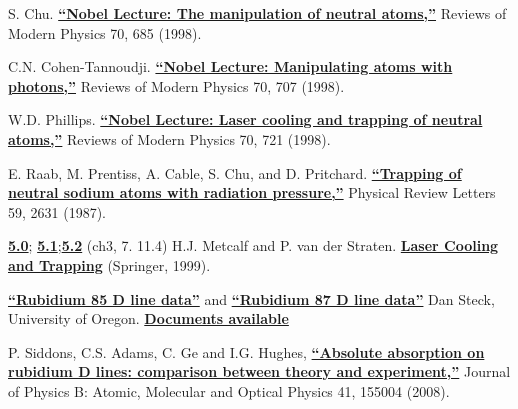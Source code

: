 \documentclass{../lab}
\begin{document}
\begin{thebibliography}{}
\label{sec:References}
     S. Chu. \href{http://physics111.lib.berkeley.edu/Physics111/Reprints/MOT/Steven\_Chu-Neutral\_Particles.pdf}{\textbf{``Nobel Lecture: The manipulation of neutral atoms,''}} Reviews of Modern Physics 70, 685 (1998).

     C.N. Cohen-Tannoudji. \href{http://physics111.lib.berkeley.edu/Physics111/Reprints/MOT/Cohen-Tannoudji\_RMP\_70-707.pdf}{\textbf{``Nobel Lecture: Manipulating atoms with photons,''}} Reviews of Modern Physics 70, 707 (1998).

     W.D. Phillips. \href{http://physics111.lib.berkeley.edu/Physics111/Reprints/MOT/W.Philips_RMP_70-3-1998_p721_1.pdf}{\textbf{``Nobel Lecture: Laser cooling and trapping of neutral atoms,''}} Reviews of Modern Physics 70, 721 (1998).

     E. Raab, M. Prentiss, A. Cable, S. Chu, and D. Pritchard. \href{http://physics111.lib.berkeley.edu/Physics111/Reprints/MOT/Raab_Prentiss_Chu_PRL_v59-23-1987.pdf}{\textbf{``Trapping of neutral sodium atoms with radiation pressure,''}} Physical Review Letters 59, 2631 (1987).

     \href{http://physics111.lib.berkeley.edu/Physics111/Reprints/MOT/Laser\_Cooling\_and\_Trapping\_HJ\_Metcalf/MOT\%20OCR\%20ch.\%203\%20force\%20on\%20two-level\%20atoms.pdf}{\textbf{5.0}}; \href{http://physics111.lib.berkeley.edu/Physics111/Reprints/MOT/Laser\_Cooling\_and\_Trapping\_HJ\_Metcalf/MOT\%20OCR\%20ch.\%207\%20optical\%20molasses.pdf}{\textbf{5.1}};\href{http://physics111.lib.berkeley.edu/Physics111/Reprints/MOT/Laser\_Cooling\_and\_Trapping\_HJ\_Metcalf/MOT\%20OCR\%20\%20ch.\%2011.4\%20magneto-optical\%20traps.pdf}{\textbf{5.2}} (ch3, 7. 11.4) H.J. Metcalf and P. van der Straten. \href{http://physics111.lib.berkeley.edu/Physics111/Reprints/MOT/Laser\_Cooling\_and\_Trapping\_HJ\_Metcalf/}{\textbf{Laser Cooling and Trapping}} (Springer, 1999).

     \href{http://physics111.lib.berkeley.edu/Physics111/Reprints/MOT/rubidium85numbers.pdf}{\textbf{``Rubidium 85 D line data''}} and \href{http://physics111.lib.berkeley.edu/Physics111/Reprints/MOT/rubidium87numbers.pdf}{\textbf{``Rubidium 87 D line data''}} Dan Steck, University of Oregon. \href{http://steck.us/alkalidata/}{\textbf{Documents available}}

     P. Siddons, C.S. Adams, C. Ge and I.G. Hughes, \href{http://physics111.lib.berkeley.edu/Physics111/Reprints/MOT/Absolute\%20absorption\%20on\%20the\%20rubidium\%20D\%20lines-0805.1139v1.pdf}{\textbf{``Absolute absorption on rubidium D lines: comparison between theory and experiment,''}} Journal of Physics B: Atomic, Molecular and Optical Physics 41, 155004 (2008).


\end{thebibliography}
\end{document}
